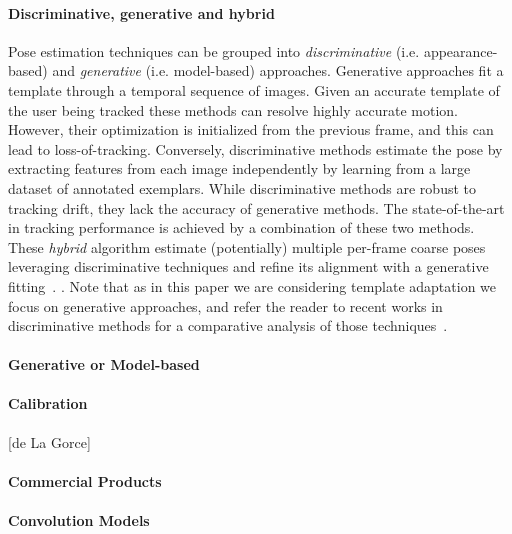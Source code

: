 \paragraph{Discriminative, generative and hybrid}
Pose estimation techniques can be grouped into \emph{discriminative} (i.e. appearance-based) and \emph{generative} (i.e. model-based) approaches. 
Generative approaches fit a template through a temporal sequence of images. Given an accurate template of the user being tracked these methods can resolve highly accurate motion. However, their optimization is initialized from the previous frame, and this can lead to loss-of-tracking. 
Conversely, discriminative methods estimate the pose by extracting features from each image independently by learning from a large dataset of annotated exemplars. While discriminative methods are robust to tracking drift, they lack the accuracy of generative methods. 
The state-of-the-art in tracking performance is achieved by a combination of these two methods. These \emph{hybrid} algorithm estimate (potentially) multiple per-frame coarse poses leveraging discriminative techniques and refine its alignment with a generative fitting~\cite{sharp2015accurate,sridhar2015fast}. .
Note that as in this paper we are considering template adaptation we focus on generative approaches, and refer the reader to recent works in discriminative methods for a comparative analysis of those techniques~\cite{}.

\paragraph{Generative or Model-based}

\paragraph{Calibration}
[de La Gorce]

\paragraph{Commercial Products}

\paragraph{Convolution Models}



